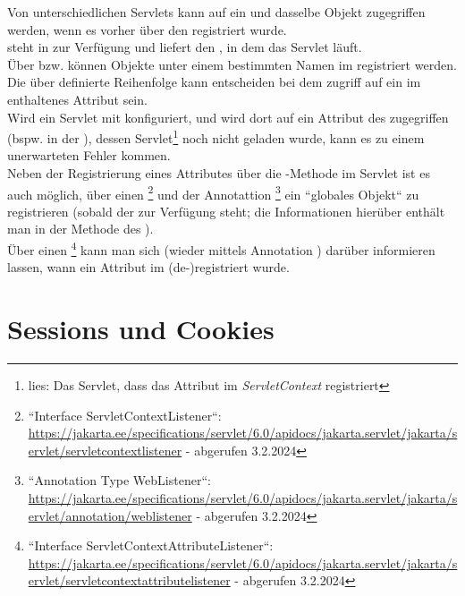 Von unterschiedlichen Servlets kann auf ein und dasselbe Objekt zugegriffen werden, wenn es vorher über den  registriert wurde.\\
 steht in  zur Verfügung und liefert den , in dem das Servlet läuft.\\
Über  bzw.  können Objekte unter einem bestimmten Namen im  registriert werden.\\

\noindent
Die über  definierte Reihenfolge kann entscheiden bei dem zugriff auf ein im  enthaltenes Attribut sein.\\
Wird ein Servlet mit  konfiguriert, und wird dort auf ein Attribut des  zugegriffen (bspw. in der ), dessen Servlet\footnote{
lies: Das Servlet, dass das Attribut im \textit{ServletContext} registriert
} noch nicht geladen wurde, kann es zu einem unerwarteten Fehler kommen.\\

\noindent
Neben der Registrierung eines Attributes über die -Methode im Servlet ist es auch möglich, über einen \footnote{
    ``Interface ServletContextListener``: \url{https://jakarta.ee/specifications/servlet/6.0/apidocs/jakarta.servlet/jakarta/servlet/servletcontextlistener} - abgerufen 3.2.2024
} und der Annotattion \footnote{
``Annotation Type WebListener``: \url{https://jakarta.ee/specifications/servlet/6.0/apidocs/jakarta.servlet/jakarta/servlet/annotation/weblistener} - abgerufen 3.2.2024
} ein ``globales Objekt`` zu registrieren (sobald der  zur Verfügung steht; die Informationen hierüber enthält man in der Methode  des ).\\

\noindent
Über einen \footnote{
    ``Interface ServletContextAttributeListener``: \url{https://jakarta.ee/specifications/servlet/6.0/apidocs/jakarta.servlet/jakarta/servlet/servletcontextattributelistener} - abgerufen 3.2.2024
} kann man sich (wieder mittels Annotation ) darüber informieren lassen, wann ein Attribut im  (de-)registriert wurde.

\section{Sessions und Cookies}

